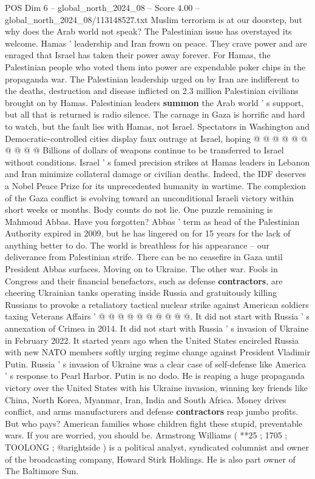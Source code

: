 \begin{textsample}{POS Dim 6 – global\_north\_2024\_08 – Score 4.00 – global\_north\_2024\_08/113148527.txt}
Muslim terrorism is at our doorstep, but why does the Arab world not speak?
The Palestinian issue has overstayed its welcome.
Hamas ' leadership and Iran frown on peace.
They crave power and are enraged that Israel has taken their power away forever.
For Hamas, the Palestinian people who voted them into power are expendable poker chips in the propaganda war.
The Palestinian leadership urged on by Iran are indifferent to the deaths, destruction and disease inflicted on 2.3 million Palestinian civilians brought on by Hamas.
Palestinian leaders \textbf{summon} the Arab world ' s support, but all that is returned is radio silence.
The carnage in Gaza is horrific and hard to watch, but the fault lies with Hamas, not Israel.
Spectators in Washington and Democratic-controlled cities display faux outrage at Israel, hoping @ @ @ @ @ @ @ @ @ @ Billions of dollars of weapons continue to be transferred to Israel without conditions.
Israel ' s famed precision strikes at Hamas leaders in Lebanon and Iran minimize collateral damage or civilian deaths.
Indeed, the IDF deserves a Nobel Peace Prize for its unprecedented humanity in wartime.
The complexion of the Gaza conflict is evolving toward an unconditional Israeli victory within short weeks or months.
Body counts do not lie.
One puzzle remaining is Mahmoud Abbas.
Have you forgotten?
Abbas ' term as head of the Palestinian Authority expired in 2009, but he has lingered on for 15 years for the lack of anything better to do.
The world is breathless for his appearance -- our deliverance from Palestinian strife.
There can be no ceasefire in Gaza until President Abbas surfaces.
Moving on to Ukraine.
The other war.
Fools in Congress and their financial benefactors, such as defense \textbf{contractors}, are cheering Ukrainian tanks operating inside Russia and gratuitously killing Russians to provoke a retaliatory tactical nuclear strike against American soldiers taxing Veterans Affairs ' @ @ @ @ @ @ @ @ @ @.
It did not start with Russia ' s annexation of Crimea in 2014.
It did not start with Russia ' s invasion of Ukraine in February 2022.
It started years ago when the United States encircled Russia with new NATO members softly urging regime change against President Vladimir Putin.
Russia ' s invasion of Ukraine was a clear case of self-defense like America ' s response to Pearl Harbor.
Putin is no dodo.
He is reaping a huge propaganda victory over the United States with his Ukraine invasion, winning key friends like China, North Korea, Myanmar, Iran, India and South Africa.
Money drives conflict, and arms manufacturers and defense \textbf{contractors} reap jumbo profits.
But who pays?
American families whose children fight these stupid, preventable wars.
If you are worried, you should be.
Armstrong Williams ( **25 ; 1705 ; TOOLONG ; @arightside ) is a political analyst, syndicated columnist and owner of the broadcasting company, Howard Stirk Holdings.
He is also part owner of The Baltimore Sun.

\end{textsample}
